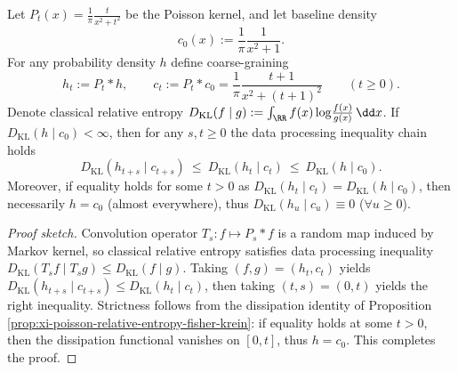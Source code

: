 \begin{proposition}\label{prop:xi-poisson-relative-entropy-contraction}
Let \(P_t(x)=\frac{1}{\pi}\frac{t}{x^2+t^2}\) be the Poisson kernel, and let baseline density
\[
c_0(x):=\frac{1}{\pi}\frac{1}{x^2+1}.
\]
For any probability density \(h\) define coarse-graining
\[
h_t:=P_t*h,\qquad c_t:=P_t*c_0=\frac{1}{\pi}\frac{t+1}{x^2+(t+1)^2}\qquad(t\ge 0).
\]
Denote classical relative entropy
\(
D_{\mathrm{KL}}(f\mid g):=\int_{\RR} f(x)\log\!\frac{f(x)}{g(x)}\,\dd x
\).
If \(D_{\mathrm{KL}}(h\mid c_0)<\infty\), then for any \(s,t\ge 0\) the data processing inequality chain holds
\begin{equation}\label{eq:xi-poisson-kl-monotone}
\boxed{\;
D_{\mathrm{KL}}(h_{t+s}\mid c_{t+s})\ \le\ D_{\mathrm{KL}}(h_t\mid c_t)\ \le\ D_{\mathrm{KL}}(h\mid c_0).\;}
\end{equation}
Moreover, if equality holds for some \(t>0\) as \(D_{\mathrm{KL}}(h_t\mid c_t)=D_{\mathrm{KL}}(h\mid c_0)\), then necessarily \(h=c_0\) (almost everywhere), thus \(D_{\mathrm{KL}}(h_u\mid c_u)\equiv 0\) (\(\forall u\ge 0\)).
\end{proposition}

\begin{proof}[Proof sketch]
Convolution operator \(T_s:f\mapsto P_s*f\) is a random map induced by Markov kernel, so classical relative entropy satisfies data processing inequality
\(
D_{\mathrm{KL}}(T_s f\mid T_s g)\le D_{\mathrm{KL}}(f\mid g)
\).
Taking \((f,g)=(h_t,c_t)\) yields
\(
D_{\mathrm{KL}}(h_{t+s}\mid c_{t+s})\le D_{\mathrm{KL}}(h_t\mid c_t)
\), then taking \((t,s)=(0,t)\) yields the right inequality.
Strictness follows from the dissipation identity of Proposition \ref{prop:xi-poisson-relative-entropy-fisher-krein}: if equality holds at some \(t>0\), then the dissipation functional vanishes on \([0,t]\), thus \(h=c_0\). This completes the proof.
\end{proof}

